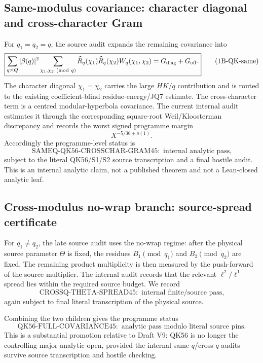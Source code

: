 \documentclass[11pt]{article}
\theoremstyle{definition}
\theoremstyle{remark}
\newcommand{\1}{\mathbf 1}
\begin{document}
\subsection{Same-modulus covariance: character diagonal and cross-character Gram}

For $q_1=q_2=q$, the source audit expands the remaining covariance into
\[
 \boxed{
 \sum_{q\asymp Q}|\beta(q)|^2
 \sum_{\chi_1,\chi_2\ (\mathrm{mod}\ q)}
 \widehat R_q(\chi_1)\widehat R_q(\chi_2)W_q(\chi_1,\chi_2)
 =G_{\rm diag}+G_{\rm off}.}
\tag{1B-QK-same}
\]
The character diagonal $\chi_1=\chi_2$ carries the large $HK/q$ contribution and is routed to the existing
coefficient-blind residue-energy/JQ7 estimate.  The cross-character term is a centred modular-hyperbola
covariance.  The current internal audit estimates it through the corresponding square-root Weil/Kloosterman
discrepancy and records the worst signed programme margin
\[
 \boxed{X^{-5/36+o(1)}.}
\tag{1B-QK-margin}
\]
Accordingly the programme-level status is
\[
 \boxed{\mathrm{SAMEQ\!\mbox{-}QK56\!\mbox{-}CROSSCHAR\!\mbox{-}GRAM45}:
 \text{ internal analytic pass,}}
\tag{1B-QK-same-status}
\]
subject to the literal QK56/S1/S2 source transcription and a final hostile audit.  This is an internal analytic
claim, not a published theorem and not a Lean-closed analytic leaf.

\subsection{Cross-modulus no-wrap branch: source-spread certificate}

For $q_1\ne q_2$, the late source audit uses the no-wrap regime: after the physical source parameter $\Theta$
is fixed, the residues $B_1\pmod{q_1}$ and $B_2\pmod{q_2}$ are fixed.  The remaining product multiplicity is
then measured by the push-forward of the source multiplier.  The internal audit records that the relevant
$\ell^2/\ell^1$ spread lies within the required source budget.  We record
\[
 \boxed{\mathrm{CROSSQ\!\mbox{-}THETA\!\mbox{-}SPREAD45}:
 \text{ internal finite/source pass,}}
\tag{1B-QK-cross-status}
\]
again subject to final literal transcription of the physical source.

Combining the two children gives the programme status
\[
 \boxed{\mathrm{QK56\!\mbox{-}FULL\!\mbox{-}COVARIANCE45}:
 \text{ analytic pass modulo literal source pins}.}
\tag{1B-QK-full-status}
\]
This is a substantial promotion relative to Draft V9: QK56 is no longer the controlling major analytic open,
provided the internal same-$q$/cross-$q$ audits survive source transcription and hostile checking.
\end{document}
